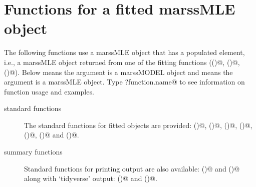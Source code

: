 \section{Functions for a fitted marssMLE object}
The following functions use a marssMLE object that has a populated \verb@par@ element, i.e., a marssMLE object returned from one of the fitting functions (\verb@MARSS()@, \verb@MARSSkem()@, \verb@MARSSoptim()@).  Below \verb@MODELobj@ means the argument is a marssMODEL object and \verb@MLEobj@ means the argument is a marssMLE object.  Type \verb@?function.name@ to see information on function usage and examples.
\begin{description}
  \item[standard functions] The standard \R functions for fitted objects are provided: \verb@residuals()@, \verb@fitted()@, \verb@logLik()@, \verb@AIC()@, \verb@coef()@, \verb@predict()@ and \verb@tsSmooth()@.
  \item[summary functions] Standard functions for printing output are also available: \verb@summary()@ and \verb@print()@ along with `tidyverse' output: \verb@tidy()@ and \verb@glance()@.
\end{description}

